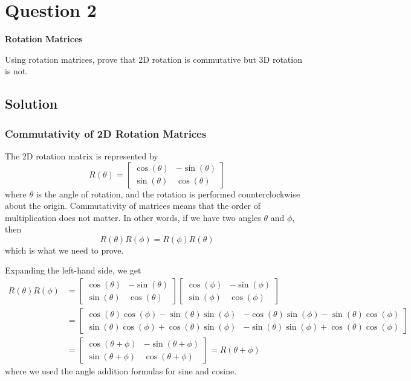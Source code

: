 \section*{Question 2}

\textbf{Rotation Matrices}

Using rotation matrices, prove that 2D rotation is commutative but 3D rotation is not.

\subsection*{Solution}

\subsubsection*{Commutativity of 2D Rotation Matrices}

The 2D rotation matrix is represented by
\begin{equation*}
    R(\theta) = \begin{bmatrix}
        \cos(\theta) & -\sin(\theta) \\
        \sin(\theta) & \cos(\theta)
    \end{bmatrix}
\end{equation*}
where \( \theta \) is the angle of rotation, and the rotation is performed counterclockwise about the origin.
Commutativity of matrices means that the order of multiplication does not matter.
In other words, if we have two angles \( \theta \) and \( \phi \), then
\begin{equation*}
    R(\theta)R(\phi) = R(\phi)R(\theta)
\end{equation*}
which is what we need to prove.

Expanding the left-hand side, we get
\begin{align*}
    R(\theta)R(\phi)
     & =
    \begin{bmatrix}
        \cos(\theta) & -\sin(\theta) \\
        \sin(\theta) & \cos(\theta)
    \end{bmatrix}
    \begin{bmatrix}
        \cos(\phi) & -\sin(\phi) \\
        \sin(\phi) & \cos(\phi)
    \end{bmatrix}
    \\ & =
    \begin{bmatrix}
        \cos(\theta)\cos(\phi) - \sin(\theta)\sin(\phi) & -\cos(\theta)\sin(\phi) - \sin(\theta)\cos(\phi) \\
        \sin(\theta)\cos(\phi) + \cos(\theta)\sin(\phi) & -\sin(\theta)\sin(\phi) + \cos(\theta)\cos(\phi)
    \end{bmatrix}
    \\ & =
    \begin{bmatrix}
        \cos(\theta + \phi) & -\sin(\theta + \phi) \\
        \sin(\theta + \phi) & \cos(\theta + \phi)
    \end{bmatrix}
    =
    R(\theta + \phi)
\end{align*}
where we used the angle addition formulas for sine and cosine.

